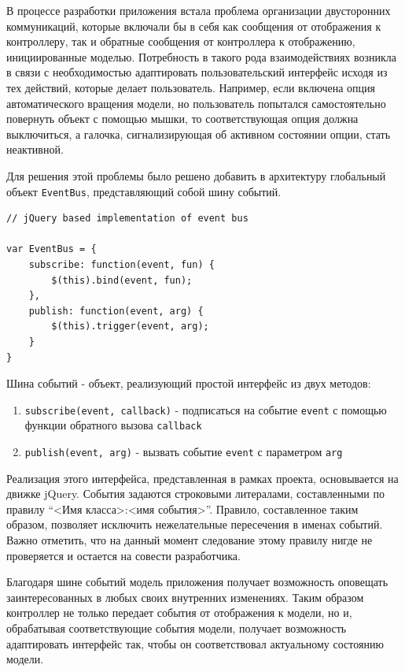\documentclass[12pt, a4paper]{article}
\begin{document}
В процессе разработки приложения встала проблема организации двусторонних
коммуникаций,
которые включали бы в себя как сообщения от отображения к контроллеру, так и
обратные сообщения от контроллера к отображению, инициированные моделью.
Потребность в такого рода взаимодействиях возникла в связи с необходимостью
адаптировать пользовательский интерфейс исходя из тех действий, которые делает
пользователь. Например, если включена опция автоматического вращения модели,
но пользователь попытался самостоятельно повернуть объект с помощью мышки, то
соответствующая опция должна выключиться, а галочка, сигнализирующая об активном
состоянии опции, стать неактивной.

Для решения этой проблемы было решено добавить в архитектуру глобальный объект
\texttt{EventBus}, представляющий собой шину событий.

\begin{lstlisting}
// jQuery based implementation of event bus

var EventBus = {
    subscribe: function(event, fun) {
        $(this).bind(event, fun);
    },
    publish: function(event, arg) {
        $(this).trigger(event, arg);
    }
}
\end{lstlisting}

Шина событий - объект, реализующий простой интерфейс из двух методов:
\begin{enumerate}
    \item \texttt{subscribe(event, callback)} - подписаться на событие
    \texttt{event} с помощью функции обратного вызова \texttt{callback}
    \item \texttt{publish(event, arg)} - вызвать событие
    \texttt{event} с параметром \texttt{arg}
\end{enumerate}

Реализация этого интерфейса, представленная в рамках проекта, основывается на
движке jQuery. События задаются строковыми литералами, составленными по правилу
``<Имя класса>:<имя события>''. Правило, составленное таким образом, позволяет
исключить нежелательные пересечения в именах событий. Важно отметить, что на
данный момент следование этому правилу нигде не проверяется и остается на
совести разработчика.

Благодаря шине событий модель приложения получает возможность оповещать
заинтересованных в любых своих внутренних изменениях. Таким образом контроллер
не только передает события от отображения к модели, но и, обрабатывая
соответствующие события модели, получает возможность адаптировать интерфейс так,
чтобы он соответствовал актуальному состоянию модели.
\end{document}
